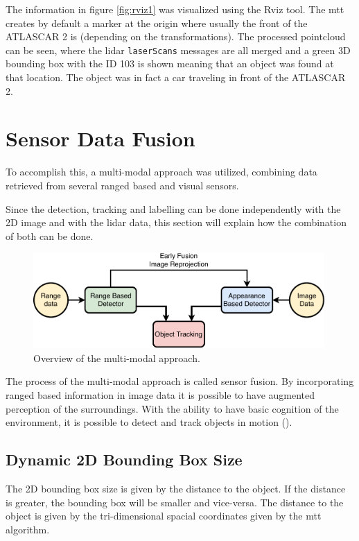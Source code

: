 The information in figure \ref{fig:rviz1} was visualized using the Rviz tool. The \gls{mtt} creates by default a marker at the origin where usually the front of the ATLASCAR 2 is (depending on the transformations). The processed pointcloud can be seen, where the \gls{lidar} \texttt{laserScans} messages are all merged and a green 3D bounding box with the ID 103 is shown meaning that an object was found at that location. The object was in fact a car traveling in front of the ATLASCAR 2. 

\section{Sensor Data Fusion}

To accomplish this, a multi-modal approach was utilized, combining data retrieved from several ranged based and visual sensors.

Since the detection, tracking and labelling can be done independently with the 2D image and with the \gls{lidar} data, this section will explain how the combination of both can be done.

\begin{figure}[htp]
	
	\centering
	\includegraphics[width=0.99\textwidth]{caplabel/imgs/multimodal}
	
	\caption{ Overview of the multi-modal approach. }
	\label{fig:multimodal}
	
\end{figure}

The process of the multi-modal approach is called sensor fusion. By incorporating ranged based information in image data it is possible to have augmented perception of the surroundings. With the ability to have basic cognition of the environment, it is possible to detect and track objects in motion (\cite{Spinello2010}).

\subsection{Dynamic 2D Bounding Box Size}
The 2D bounding box size is given by the distance to the object. If the distance is greater, the bounding box will be smaller and vice-versa. The distance to the object is given by the tri-dimensional spacial coordinates given by the \gls{mtt} algorithm.

